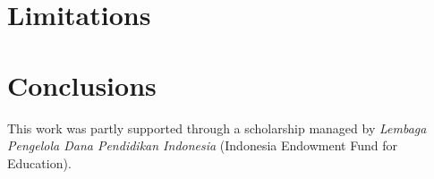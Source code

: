\documentclass[sigconf]{acmart}
\begin{document}
\section{Limitations}
\label{sec:limitations}

\section{Conclusions}
\label{sec:conclusions}

\begin{acks}
This work was partly supported through a scholarship managed by \emph{Lembaga Pengelola Dana Pendidikan Indonesia} (Indonesia Endowment Fund for Education).
\end{acks}



 
\end{document}
